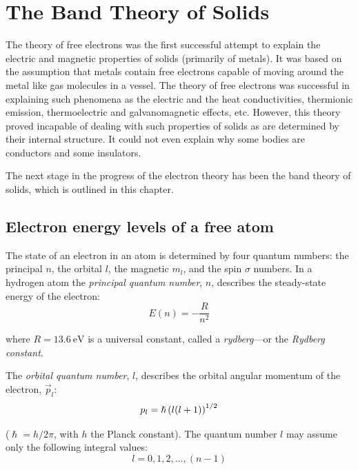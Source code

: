 

\chapter[The Band Theory of Solids]{The Band Theory of Solids}\label{chap:5}

The theory of free electrons was the first successful attempt to explain the electric and magnetic properties of solids (primarily of metals). It was based on the assumption that metals contain free electrons capable of moving around the metal like gas molecules in a vessel. The theory of free electrons was successful in explaining such phenomena as the electric and the heat conductivities, thermionic emission, thermoelectric and galvanomagnetic effects, etc. However, this theory proved incapable of dealing with such properties of solids as are determined by their internal structure. It could not even explain why some bodies are conductors and some insulators.

The next stage in the progress of the electron theory has been the band theory of solids, which is outlined in this chapter.

\section{Electron energy levels of a free atom}\label{sec:37}

The state of an electron in an atom is determined by four quantum numbers: the principal $n$, the orbital $l$, the magnetic $m_l$, and the spin $\sigma$ numbers. In a hydrogen atom the \textit{principal quantum number}, $n$, describes the steady-state energy of the electron:
\begin{equation}\label{eq:5_1}
    E(n) = -\frac{R}{n^2}
\end{equation}

\noindent
where $R=\SI{13.6}{\electronvolt}$ is a universal constant, called a \textit{rydberg}---or the \textit{Rydberg constant}.

The \textit{orbital quantum number}, $l$, describes the orbital angular momentum of the electron, $\vec{p}_l$:
\begin{equation}\label{eq:5_2}
    p_l = \hslash \left(l (l + 1)\right)^{1/2}
\end{equation}

\noindent
($\hslash=h/2\pi$, with $h$ the Planck constant). The quantum number $l$ may assume only the following integral values:
\begin{equation*}
    l = 0, 1, 2, \ldots, (n - 1)
\end{equation*}

